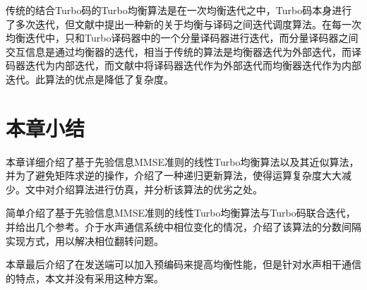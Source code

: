 传统的结合Turbo码的Turbo均衡算法是在一次均衡迭代之中，Turbo码本身进行了多次迭代，但文献中提出一种新的关于均衡与译码之间迭代调度算法。在每一次均衡迭代中，只和Turbo译码器中的一个分量译码器进行迭代，而分量译码器之间交互信息是通过均衡器的迭代，相当于传统的算法是均衡器迭代为外部迭代，而译码器迭代为内部迭代，而文献中将译码器迭代作为外部迭代而均衡器迭代作为内部迭代。此算法的优点是降低了复杂度。

\section{本章小结}
本章详细介绍了基于先验信息MMSE准则的线性Turbo均衡算法以及其近似算法，并为了避免矩阵求逆的操作，介绍了一种递归更新算法，使得运算复杂度大大减少。文中对介绍算法进行仿真，并分析该算法的优劣之处。

简单介绍了基于先验信息MMSE准则的线性Turbo均衡算法与Turbo码联合迭代，并给出几个参考。介于水声通信系统中相位变化的情况，介绍了该算法的分数间隔实现方式，用以解决相位翻转问题。

本章最后介绍了在发送端可以加入预编码来提高均衡性能，但是针对水声相干通信的特点，本文并没有采用这种方案。
%
\clearpage{\pagestyle{empty}\cleardoublepage}
